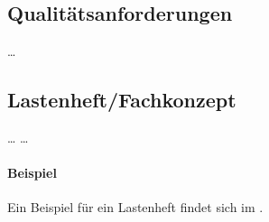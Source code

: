 \subsection{Qualitätsanforderungen}
\label{sec:Qualitaetsanforderungen}
    \dots

\subsection{Lastenheft/Fachkonzept}
\label{sec:Lastenheft}
    \dots
    \dots

\paragraph{Beispiel}
Ein Beispiel für ein Lastenheft findet sich im . 

